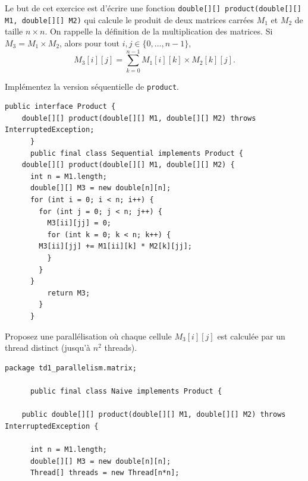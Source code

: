 
\begingroup

\begin{exercice}[Parallélisation]
  \label{exo:introduction/matrix}

  Le but de cet exercice est d'écrire une fonction \lstinline{double[][] product(double[][] M1, double[][] M2)}
  qui calcule le produit de deux matrices carrées $M_1$ et $M_2$ de taille $n\times n$.
  On rappelle la définition de la multiplication des matrices. Si $M_3 = M_1 \times M_2$, alors pour tout
  $i,j \in \{0,\dots,n-1\}$,
  $$ M_3[i][j] = \sum_{k=0}^{n-1} M_1[i][k] \times M_2[k][j].$$

  \begin{questions}
  \item Implémentez la version séquentielle de \lstinline{product}.
  \end{questions}
  \begin{corrections}
    \begin{lstlisting}[gobble=6]
      public interface Product {
	double[][] product(double[][] M1, double[][] M2) throws InterruptedException;
      }
      public final class Sequential implements Product {
	double[][] product(double[][] M1, double[][] M2) {
	  int n = M1.length;
	  double[][] M3 = new double[n][n];
	  for (int i = 0; i < n; i++) {
	    for (int j = 0; j < n; j++) {
	      M3[ii][jj] = 0;
	      for (int k = 0; k < n; k++) {
		M3[ii][jj] += M1[ii][k] * M2[k][jj];
	      }
	    }
	  }
          return M3;
        }
      }
    \end{lstlisting}
  \end{corrections}

  \begin{questions}
  \item Proposez une parallélisation où chaque cellule $M_3[i][j]$ est calculée par un thread distinct (jusqu'à $n^2$ threads). 
  \end{questions}
  \begin{corrections}
    \begin{lstlisting}[gobble=6]
      package td1_parallelism.matrix;

      public final class Naive implements Product {

	public double[][] product(double[][] M1, double[][] M2) throws InterruptedException {

	  int n = M1.length;
	  double[][] M3 = new double[n][n];
	  Thread[] threads = new Thread[n*n];


\end{lstlisting}
\end{corrections}
\end{exercice}
